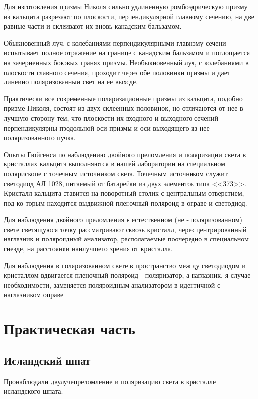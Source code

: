 Для изготовления призмы Николя сильно удлиненную ромбоэдрическую призму из кальцита разрезают по плоскости, перпендикулярной главному сечению, на две равные части и склеивают их вновь канадским бальзамом.

Обыкновенный луч, с колебаниями перпендикулярными главному сечени
испытывает полное отражение на границе с канадским бальзамом и
поглощается на зачерненных боковых гранях призмы. Необыкновенный
луч, с колебаниями в плоскости главного сечения, проходит через
обе половинки призмы и дает линейно поляризованный свет на ее
выходе.

Практически все современные поляризационные призмы из каль­цита, подобно призме Николя, состоят из двух склеенных половинок,
но отличаются от нее в лучшую сторону тем, что плоскости их входного и выходного сечений перпендикулярны продольной оси призмы
и оси выходящего из нее поляризованного пучка.

Опыты Гюйгенса по наблюдению двойного преломления и поля­ризации света в кристаллах кальцита выполняются в нашей лабора­тории на специальном полярископе с точечным источником
света. Точечным источником служит светодиод АЛ 1028, питаемый
от батарейки из двух элементов типа <<373>>. Кристалл кальцита
ставится на поворотный столик с центральным отверстием, под ко­
торым находится выдвижной пленочный поляроид в оправе и свето­диод.

Для наблюдения двойного преломления в естественном (не -
поляризованном) свете светящуюся точку рассматривают сквозь
кристалл, через центрированный наглазник и поляроидный анализатор, располагаемые поочередно в специальном гнезде,
на расстоянии наилучшего зрения от кристалла.

Для наблюдения в поляризованном свете в пространство меж­
ду светодиодом и кристаллом вдвигается пленочный поляроид - поляризатор, а наглазник, я случае необходимости, заменяется поляроидным анализатором в идентичной с наглазником оправе.
\section{Практическая часть}
\subsection{Исландский шпат}

Пронаблюдали двулучепреломление и поляризацию света в кристалле исландского шпата. 


